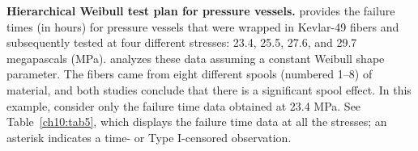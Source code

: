 \documentclass {book}
\begin{document}
\begin{sidebar}\label{ch10:ex5} {\bf Hierarchical Weibull test plan for pressure
vessels.} \citet{GK83}  provides the
failure times (in hours) for pressure vessels that were wrapped in
Kevlar-49 fibers and subsequently tested at four different
stresses: 23.4, 25.5, 27.6, and 29.7 megapascals (MPa).
\citet{CKSS91} analyzes these data assuming a constant Weibull
shape parameter. The fibers came from eight different spools
(numbered 1--8) of material, and both studies conclude that there
is a significant spool effect. In this example, consider only the
failure time data obtained at 23.4 MPa. See Table~\ref{ch10:tab5},
which displays the failure time data at all the stresses; an
asterisk indicates a time- or Type I-censored observation.
   


\end{sidebar}
\end{document}
